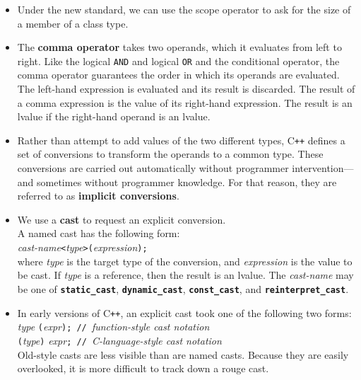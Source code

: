 \begin{itemize}
\item
Under the new standard, we can use the scope operator to ask for the size of a member of a class type.

\item
The \textbf{comma operator} takes two operands, which it evaluates from left to right. Like the logical \texttt{AND} and logical \texttt{OR} and the conditional operator, the comma operator guarantees the order in which its operands are evaluated.\\
The left-hand expression is evaluated and its result is discarded. The result of a comma expression is the value of its right-hand expression. The result is an lvalue if the right-hand operand is an lvalue.

\item
Rather than attempt to add values of the two different types, C\texttt{++} defines a set of conversions to transform the operands to a common type. These conversions are carried out automatically without programmer intervention---and sometimes without programmer knowledge. For that reason, they are referred to as \textbf{implicit conversions}.

\item
We use a \textbf{cast} to request an explicit conversion.\\
A named cast has the following form:\\
\hspace*{1em}\textit{cast-name}\texttt{<}\textit{type}\texttt{>(}\textit{expression}\texttt{);}\\
where \textit{type} is the target type of the conversion, and \textit{expression} is the value to be cast. If \textit{type} is a reference, then the result is an lvalue. The \textit{cast-name} may be one of \texttt{\textbf{static\_cast}}, \texttt{\textbf{dynamic\_cast}}, \texttt{\textbf{const\_cast}}, and \texttt{\textbf{reinterpret\_cast}}.

\item
In early versions of C\texttt{++}, an explicit cast took one of the following two forms:\\
\hspace*{1em}\textit{type }\texttt{(}\textit{expr}\texttt{); // }\textit{function-style cast notation}\\
\hspace*{1em}\texttt{(}\textit{type}\texttt{)}\textit{ expr}\texttt{; // }\textit{C-language-style cast notation}\\
Old-style casts are less visible than are named casts. Because they are easily overlooked, it is more difficult to track down a rouge cast.

\end{itemize}